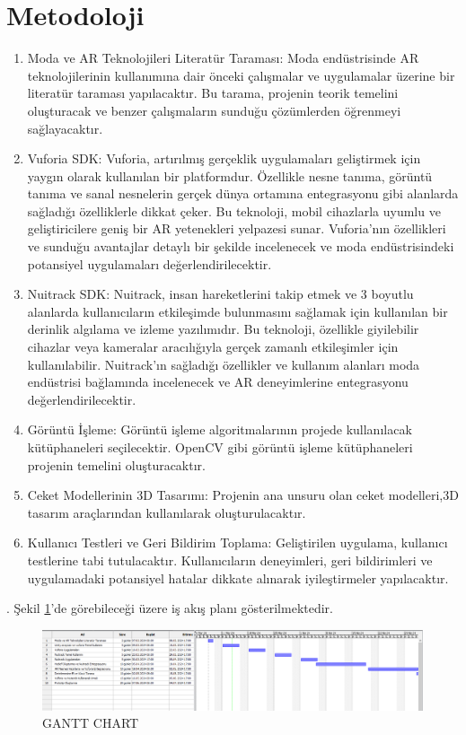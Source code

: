 \documentclass[12pt, a4paper]{article}
\begin{document}
	
	
	\section{Metodoloji}
	\begin{enumerate}
    \item Moda ve AR Teknolojileri Literatür Taraması:	
	Moda endüstrisinde AR teknolojilerinin kullanımına dair önceki çalışmalar ve uygulamalar üzerine bir literatür taraması yapılacaktır. Bu tarama, projenin teorik temelini oluşturacak ve benzer çalışmaların sunduğu çözümlerden öğrenmeyi sağlayacaktır.
	\item Vuforia SDK:	
	Vuforia, artırılmış gerçeklik uygulamaları geliştirmek için yaygın olarak kullanılan bir platformdur. Özellikle nesne tanıma, görüntü tanıma ve sanal nesnelerin gerçek dünya ortamına entegrasyonu gibi alanlarda sağladığı özelliklerle dikkat çeker. Bu teknoloji, mobil cihazlarla uyumlu ve geliştiricilere geniş bir AR yetenekleri yelpazesi sunar. Vuforia'nın özellikleri ve sunduğu avantajlar detaylı bir şekilde incelenecek ve moda endüstrisindeki potansiyel uygulamaları değerlendirilecektir.
	\item Nuitrack SDK:
	Nuitrack, insan hareketlerini takip etmek ve 3 boyutlu alanlarda kullanıcıların etkileşimde bulunmasını sağlamak için kullanılan bir derinlik algılama ve izleme yazılımıdır. Bu teknoloji, özellikle giyilebilir cihazlar veya kameralar aracılığıyla gerçek zamanlı etkileşimler için kullanılabilir. Nuitrack'ın sağladığı özellikler ve kullanım alanları moda endüstrisi bağlamında incelenecek ve AR deneyimlerine entegrasyonu değerlendirilecektir.
	 \item Görüntü İşleme:
	Görüntü işleme algoritmalarının projede kullanılacak kütüphaneleri seçilecektir. OpenCV gibi görüntü işleme kütüphaneleri projenin temelini oluşturacaktır.
	 \item Ceket Modellerinin 3D Tasarımı:
	Projenin ana unsuru olan ceket modelleri,3D tasarım araçlarından kullanılarak oluşturulacaktır.
	 \item Kullanıcı Testleri ve Geri Bildirim Toplama:
	Geliştirilen uygulama, kullanıcı testlerine tabi tutulacaktır. Kullanıcıların deneyimleri, geri bildirimleri ve uygulamadaki potansiyel hatalar dikkate alınarak iyileştirmeler yapılacaktır.
	
    \end{enumerate}.
    	Şekil \ref{gantt}'de görebileceği üzere
    iş akış planı gösterilmektedir.
    
    	\begin{figure}[!ht]
    	\caption{GANTT CHART}
    	\centering
    	\includegraphics[angle=0, width=\textwidth]{Ekran.png}
    	
    	\label{gantt}
    \end{figure}
	
	 
	
	
	
\end{document}
